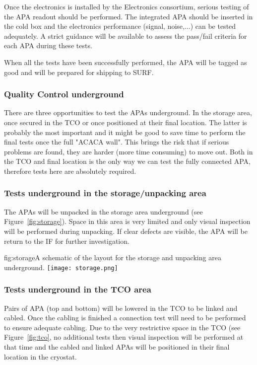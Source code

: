 Once the electronics is installed by the Electronics consortium, serious testing of the APA readout should be performed. The integrated APA should be inserted in the cold box and the electronics performance (signal, noise,...) can be tested adequately. A strict guidance will be available to assess the pass/fail criteria for each APA during these tests.

When all the tests have been successfully performed, the APA will be tagged as good and will be prepared for shipping to SURF.

\subsubsection{Quality Control underground}

There are three opportunities to test the APAs underground. In the storage area, once secured in the TCO or once positioned at their final location. The latter is probably the most important and it might be good to save time to perform the final tests once the full "ACACA wall". This brings the risk that if serious problems are found, they are harder (more time consuming) to move out. Both in the TCO and final location is the only way we can test the fully connected APA, therefore tests here are absolutely required. 

\subsubsection{Tests underground in the storage/unpacking area}

The APAs will be unpacked in the storage area underground (see Figure~\ref{fig:storage}). Space in this area is very limited and only visual inspection will be performed during unpacking. If clear defects are visible, the APA will be return to the IF for further investigation.

\begin{dunefigure}{fig:storage}{A schematic of the layout for the storage and unpacking area underground.}
\texttt{[image: storage.png]} 
\end{dunefigure}

\subsubsection{Tests underground in the TCO area}

Pairs of APA (top and bottom) will be lowered in the TCO to be linked and cabled. Once the cabling is finished a connection test will need to be performed to ensure adequate cabling. Due to the very restrictive space in the TCO (see Figure~\ref{fig:tco}, no additional tests then visual inspection will be performed at that time and the cabled and linked APAs will be positioned in their final location in the cryostat.

